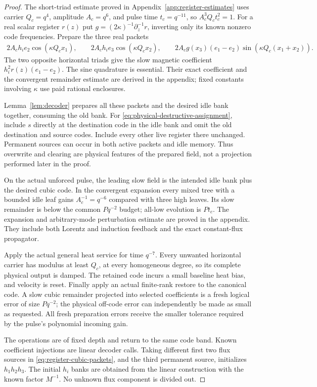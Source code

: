 \documentclass[11pt,a4paper]{amsart}
\theoremstyle{definition}
\theoremstyle{remark}
\numberwithin{equation}{section}
\begin{document}
\begin{proof}
The short-triad estimate proved in Appendix~\ref{app:register-estimates}
uses carrier $Q_c=q^4$, amplitude $A_c=q^6$, and pulse time $t_c=q^{-11}$,
so $A_c^3Q_ct_c^2=1$.  For a real scalar register $r(z)$ put
$g=(2\kappa)^{-1}\partial_z^{-1}r$, inverting only its known nonzero code
frequencies.  Prepare the three real packets
\begin{align}\label{eq:register-cubic-packets}
 2A_ch_i e_2\cos(\kappa Q_cx_1),\qquad
 2A_ch_i e_3\cos(\kappa Q_cx_2),\qquad
 2A_cg(x_3)(e_1-e_2)\sin(\kappa Q_c(x_1+x_2)).
\end{align}
The two opposite horizontal triads give the slow magnetic coefficient
$h_i^2r(z)(e_1-e_2)$.  The sine quadrature is essential.  Their exact
coefficient and the convergent remainder estimate are derived in the
appendix; fixed constants involving $\kappa$ use paid rational enclosures.

Lemma~\ref{lem:decoder} prepares all these packets and the desired idle
bank together, consuming the old bank.  For
\eqref{eq:physical-destructive-assignment}, include $s$ directly at the
destination code in the idle bank and omit the old destination and source
codes.  Include every other live register there unchanged.  Permanent
sources can occur in both active packets and idle memory.  Thus overwrite
and clearing are physical features of the prepared field, not a projection
performed later in the proof.

On the actual unforced pulse, the leading slow field is the intended idle
bank plus the desired cubic code.  In the convergent expansion every
mixed tree with a bounded idle leaf gains $A_c^{-1}=q^{-6}$ compared with
three high leaves.  Its slow remainder is below the common $Pq^{-2}$
budget; all-low evolution is $Pt_c$.  The expansion and arbitrary-mode
perturbation estimate are proved in the appendix.  They include both
Lorentz and induction feedback and the exact constant-flux propagator.

Apply the actual general heat service for time $q^{-7}$.  Every unwanted
horizontal carrier has modulus at least $Q_c$, at every homogeneous
degree, so its complete physical output is damped.  The retained code
incurs a small baseline heat bias, and velocity is reset.  Finally apply
an actual finite-rank restore to the canonical code.  A slow cubic
remainder projected into selected coefficients is a fresh logical error
of size $Pq^{-2}$; the physical off-code error can independently be made
as small as requested.  All fresh preparation errors receive the smaller
tolerance required by the pulse's polynomial incoming gain.

The operations are of fixed depth and return to the same code band.
Known coefficient injections are linear decoder calls.  Taking different
first two flux sources in \eqref{eq:register-cubic-packets}, and the third
permanent source, initializes $h_1h_2h_3$.  The initial $h_i$ banks are
obtained from the linear construction with the known factor $M^{-1}$.
No unknown flux component is divided out.
\end{proof}
\end{document}
